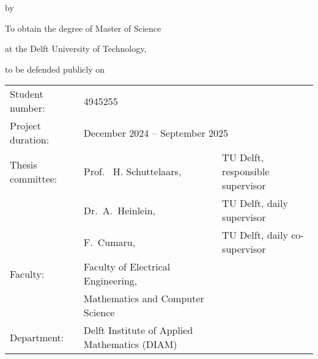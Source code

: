 \begin{titlepage}

    \begin{center}

        {\makeatletter
            \largecoverstyle\fontsize{45}{45}\selectfont\@title
            \makeatother}

        {\makeatletter
            \ifdefvoid{\@subtitle}{}{\bigskip\coverstyle\fontsize{20}{20}\selectfont\@subtitle}
            \makeatother}

        \bigskip
        \bigskip

        by

        \bigskip
        \bigskip

        {\makeatletter
            \coverstyle\fontsize{25}{25}\selectfont\@author
            \makeatother}

        \bigskip
        \bigskip

        To obtain the degree of Master of Science

        at the Delft University of Technology,

        to be defended publicly on \theDefenseDateTime

        \vfill

        \begin{tabular}{lll}
            Student number:   & 4945255                                                                                \\
            Project duration: & \multicolumn{2}{l}{December 2024 -- September 2025}                                    \\
            Thesis committee: & Prof. \ H. Schuttelaars,                            & TU Delft, responsible supervisor \\
                              & Dr.\ A.\ Heinlein,                                  & TU Delft, daily supervisor       \\
                              & F.\ Cumaru,                                         & TU Delft, daily co-supervisor    \\
            Faculty:          & Faculty of Electrical Engineering,                                                     \\
                              & Mathematics and Computer Science                                                       \\
            Department:       & Delft Institute of Applied Mathematics (DIAM)                                          \\
        \end{tabular}


\end{center}
\end{titlepage}
